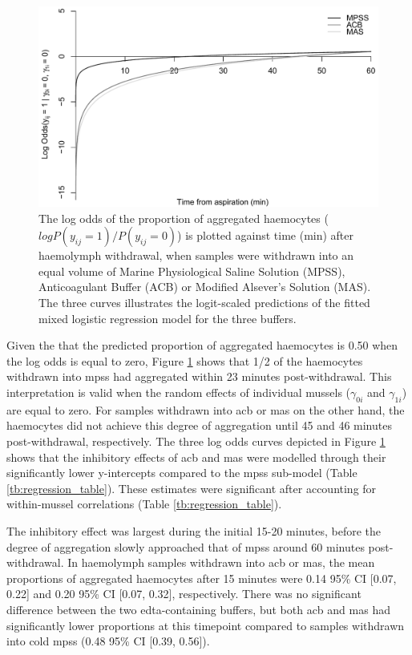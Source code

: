 \begin{figure}[!ht]
    \centering
    \includegraphics[width=1.0\textwidth]{figures/Method development/Log Odds plot.pdf}
    \caption{The log odds of the proportion of aggregated haemocytes ($log P(y_{ij} = 1) / P(y_{ij} = 0)$) is plotted against time (min) after haemolymph withdrawal, when samples were withdrawn into an equal volume of Marine Physiological Saline Solution (MPSS), Anticoagulant Buffer (ACB) or Modified Alsever's Solution (MAS). The three curves illustrates the logit-scaled predictions of the fitted mixed logistic regression model for the three buffers.}
    \label{fig:LogOdds}
\end{figure}

Given the that the predicted proportion of aggregated haemocytes is 0.50 when the log odds is equal to zero, Figure \ref{fig:LogOdds} shows that 1/2 of the haemocytes withdrawn into \acrshort{mpss} had aggregated within 23 minutes post-withdrawal. This interpretation is valid when the random effects of individual mussels ($\gamma_{0i}$ and $\gamma_{1i}$) are equal to zero. For samples withdrawn into \acrshort{acb} or \acrshort{mas} on the other hand, the haemocytes did not achieve this degree of aggregation until 45 and 46 minutes post-withdrawal, respectively. The three log odds curves depicted in Figure \ref{fig:LogOdds} shows that the inhibitory effects of \acrshort{acb} and \acrshort{mas} were modelled through their significantly lower y-intercepts compared to the \acrshort{mpss} sub-model (Table \ref{tb:regression_table}). These estimates were significant after accounting for within-mussel correlations (Table \ref{tb:regression_table}).

The inhibitory effect was largest during the initial 15-20 minutes, before the degree of aggregation slowly approached that of \acrshort{mpss} around 60 minutes post-withdrawal. In haemolymph samples withdrawn into \acrshort{acb} or \acrshort{mas}, the mean proportions of aggregated haemocytes after 15 minutes were 0.14 95\% CI [0.07, 0.22] and  0.20 95\% CI [0.07, 0.32], respectively. There was no significant difference between the two \acrshort{edta}-containing buffers, but both \acrshort{acb} and \acrshort{mas} had significantly lower proportions at this timepoint compared to samples withdrawn into cold \acrshort{mpss} (0.48 95\% CI [0.39, 0.56]).

